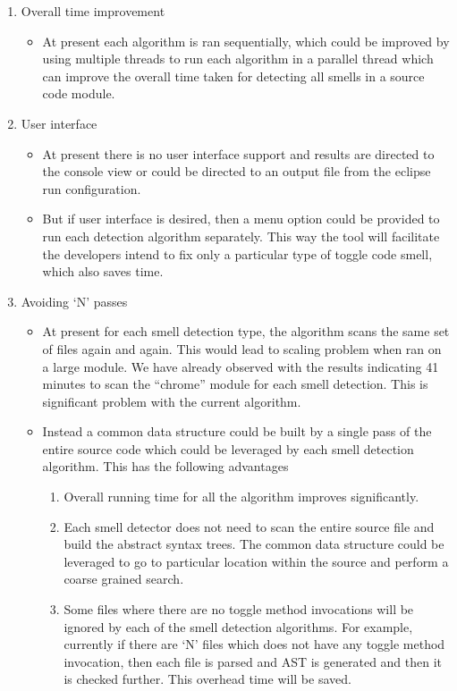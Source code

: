 \documentclass[conference]{IEEEtran}
\begin{document}
\begin{enumerate}

\item{Overall time improvement
\begin{itemize}
\item At present each algorithm is ran sequentially, which could be improved by using multiple threads to run each algorithm in a parallel thread which can improve the overall time taken for detecting all smells in a source code module.
\end{itemize}
}

\item{User interface
\begin{itemize}
\item At present there is no user interface support and results are directed to the console view or could be directed to an output file from the eclipse run configuration.
\item But if user interface is desired, then a menu option could be provided to run each detection algorithm separately. This way the tool will facilitate the developers intend to fix only a particular type of toggle code smell, which also saves time.
\end{itemize}
}

\item{Avoiding ‘N’ passes
\begin{itemize}
\item At present for each smell detection type, the algorithm scans the same set of files again and again. This would lead to scaling problem when ran on a large module. We have already observed with the results indicating 41 minutes to scan the “chrome” module for each smell detection. This is significant problem with the current algorithm.
\item {
Instead a common data structure could be built by a single pass of the entire source code which could be leveraged by each smell detection algorithm. This has the following advantages
  \begin{enumerate}
  \item Overall running time for all the algorithm improves significantly.
  \item Each smell detector does not need to scan the entire source file and build the abstract syntax trees. The common data structure could be leveraged to go to particular location within the source and perform a coarse grained search.
   \item Some files where there are no toggle method invocations will be ignored by each of the smell detection algorithms. For example, currently if there are ‘N’ files which does not have any toggle method invocation, then each file is parsed and AST is generated and then it is checked further. This overhead time will be saved.
  \end{enumerate}
}
\end{itemize}
}


\end{enumerate}
\end{document}
